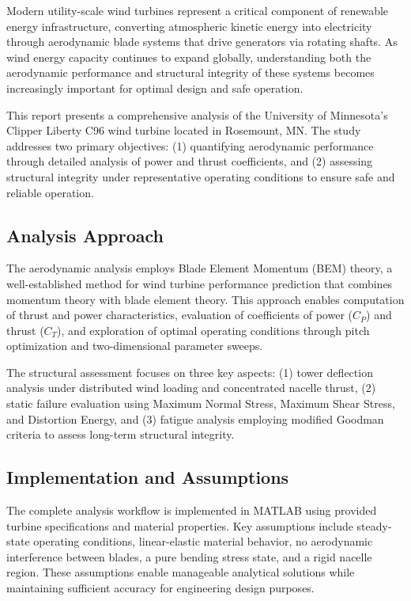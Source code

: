 \documentclass[11pt]{article}
\begin{document}
Modern utility-scale wind turbines represent a critical component of renewable energy infrastructure, converting atmospheric kinetic energy into electricity through aerodynamic blade systems that drive generators via rotating shafts. As wind energy capacity continues to expand globally, understanding both the aerodynamic performance and structural integrity of these systems becomes increasingly important for optimal design and safe operation.

This report presents a comprehensive analysis of the University of Minnesota's Clipper Liberty C96 wind turbine located in Rosemount, MN. The study addresses two primary objectives: (1) quantifying aerodynamic performance through detailed analysis of power and thrust coefficients, and (2) assessing structural integrity under representative operating conditions to ensure safe and reliable operation.

\subsection{Analysis Approach}

The aerodynamic analysis employs Blade Element Momentum (BEM) theory, a well-established method for wind turbine performance prediction that combines momentum theory with blade element theory. This approach enables computation of thrust and power characteristics, evaluation of coefficients of power ($C_P$) and thrust ($C_T$), and exploration of optimal operating conditions through pitch optimization and two-dimensional parameter sweeps.

The structural assessment focuses on three key aspects: (1) tower deflection analysis under distributed wind loading and concentrated nacelle thrust, (2) static failure evaluation using Maximum Normal Stress, Maximum Shear Stress, and Distortion Energy, and (3) fatigue analysis employing modified Goodman criteria to assess long-term structural integrity.

\subsection{Implementation and Assumptions}

The complete analysis workflow is implemented in MATLAB using provided turbine specifications and material properties. Key assumptions include steady-state operating conditions, linear-elastic material behavior, no aerodynamic interference between blades, a pure bending stress state, and a rigid nacelle region. These assumptions enable manageable analytical solutions while maintaining sufficient accuracy for engineering design purposes.
\end{document}
